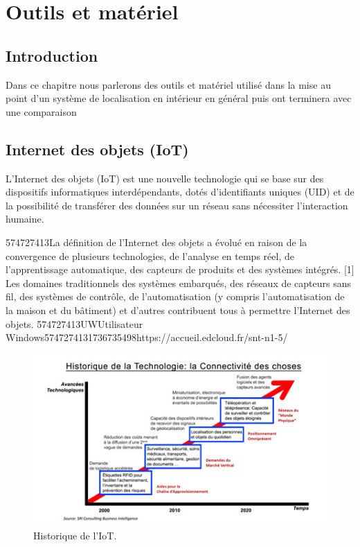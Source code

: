 \documentclass[12pt,a4paper]{report}
\begin{document}
\chapter{Outils et matériel}

\section{Introduction}
Dans ce chapitre nous parlerons des outils et matériel utilisé dans la mise au point d'un système de localisation en intérieur en général puis ont terminera avec une comparaison

\noindent \begin{flushleft}
	
	
	\noindent 
	
	\noindent 
	
	\noindent 
	
	\section{Internet des objets (IoT)}
	
	\noindent 
	
	\noindent L'Internet des objets (IoT) est une nouvelle technologie qui se base sur des dispositifs informatiques interd\'{e}pendants, dot\'{e}s d'identifiants uniques (UID) et de la possibilit\'{e} de transf\'{e}rer des donn\'{e}es sur un r\'{e}seau sans n\'{e}cessiter l'interaction humaine.
	
	\noindent 
	
	\noindent 574727413La d\'{e}finition de l'Internet des objets a \'{e}volu\'{e} en raison de la convergence de plusieurs technologies, de l'analyse en temps r\'{e}el, de l'apprentissage automatique, des capteurs de produits et des syst\`{e}mes int\'{e}gr\'{e}s. [1] Les domaines traditionnels des syst\`{e}mes embarqu\'{e}s, des r\'{e}seaux de capteurs sans fil, des syst\`{e}mes de contr\^{o}le, de l'automatisation (y compris l'automatisation de la maison et du b\^{a}timent) et d'autres contribuent tous \`{a} permettre l'Internet des objets. 574727413UWUtilisateur Windows5747274131736735498https://accueil.edcloud.fr/snt-n1-5/
	
	\noindent 
	
	\noindent 
		\begin{figure}[H]
		\centering
		\includegraphics[width=0.8\linewidth]{image31}
		\caption{Historique de l'IoT.}
		

\end{figure}
\end{flushleft}
\end{document}
